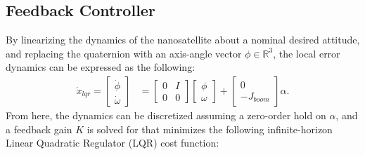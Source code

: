 \subsection{Feedback Controller}
By linearizing the dynamics of the nanosatellite about a nominal desired attitude, and replacing the quaternion with an axis-angle vector $\phi\in {\mathbb{R}}^3$, the local error dynamics can be expressed as the following:
\begin{align}
\dot{x}_{lqr} = \begin{bmatrix} \dot{\phi} \\ \dot{\omega}\end{bmatrix} &= \begin{bmatrix} 0 & I  \\ 0 & 0 
\end{bmatrix}\begin{bmatrix} {\phi} \\ {\omega} \end{bmatrix} + \begin{bmatrix}0 \\ -J_{boom} \end{bmatrix} \alpha .
\end{align}
From here, the dynamics can be discretized assuming a zero-order hold on $\alpha$, and a feedback gain $K$ is solved for that minimizes the following infinite-horizon Linear Quadratic Regulator (LQR) cost function:
